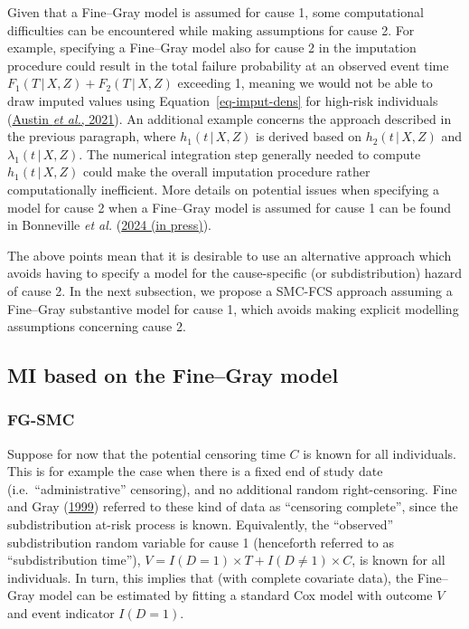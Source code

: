 \documentclass[
  letterpaper,
  DIV=11,
  numbers=noendperiod]{scrreprt}
\newcommand{\given}{\,|\,}
\begin{document}
Given that a Fine--Gray model is assumed for cause 1, some computational
difficulties can be encountered while making assumptions for cause 2.
For example, specifying a Fine--Gray model also for cause 2 in the
imputation procedure could result in the total failure probability at an
observed event time \(F_1(T \given X, Z) + F_2(T \given X, Z)\)
exceeding 1, meaning we would not be able to draw imputed values using
Equation~\ref{eq-imput-dens} for high-risk individuals
(\protect\hyperlink{ref-austinFineGraySubdistributionHazard2021}{Austin
\emph{et al.}, 2021}). An additional example concerns the approach
described in the previous paragraph, where \(h_1(t \given X, Z)\) is
derived based on \(h_2(t \given X, Z)\) and
\(\lambda_1(t \given X, Z)\). The numerical integration step generally
needed to compute \(h_1(t \given X, Z)\) could make the overall
imputation procedure rather computationally inefficient. More details on
potential issues when specifying a model for cause 2 when a Fine--Gray
model is assumed for cause 1 can be found in Bonneville \emph{et al.}
(\protect\hyperlink{ref-bonnevilleWhyYouShould2024}{2024 (in press)}).

The above points mean that it is desirable to use an alternative
approach which avoids having to specify a model for the cause-specific
(or subdistribution) hazard of cause 2. In the next subsection, we
propose a SMC-FCS approach assuming a Fine--Gray substantive model for
cause 1, which avoids making explicit modelling assumptions concerning
cause 2.

\hypertarget{sec-subdist_time}{%
\subsection{MI based on the Fine--Gray model}\label{sec-subdist_time}}

\hypertarget{sec-fg-smc}{%
\subsubsection{FG-SMC}\label{sec-fg-smc}}

Suppose for now that the potential censoring time \(C\) is known for all
individuals. This is for example the case when there is a fixed end of
study date (i.e.~``administrative'' censoring), and no additional random
right-censoring. Fine and Gray
(\protect\hyperlink{ref-fineProportionalHazardsModel1999}{1999})
referred to these kind of data as ``censoring complete'', since the
subdistribution at-risk process is known. Equivalently, the ``observed''
subdistribution random variable for cause 1 (henceforth referred to as
``subdistribution time''),
\(V = I(D = 1) \times T + I(D \neq 1) \times C\), is known for all
individuals. In turn, this implies that (with complete covariate data),
the Fine--Gray model can be estimated by fitting a standard Cox model
with outcome \(V\) and event indicator \(I(D = 1)\).
\end{document}
